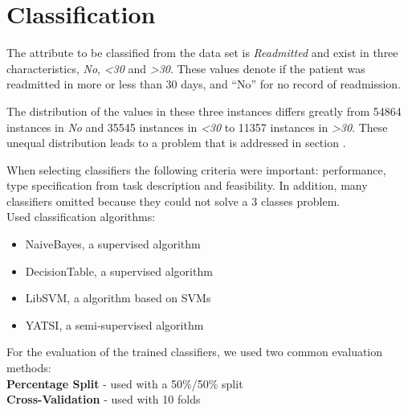 \section{Classification}
\label{classification}

The attribute to be classified from the data set is \textit{Readmitted} and exist in three characteristics, \textit{No},\textit{ \textless 30} and \textit{ \textgreater 30}. These values denote if the patient was readmitted in more or less than 30 days, and “No” for no record of readmission. \cite{OlmoMedicos}

The distribution of the values in these three instances differs greatly from 54864 instances in \textit{No} and 35545 instances in \textit{ \textless 30} to 11357 instances in \textit{ \textgreater 30}. These unequal distribution leads to a problem that is addressed in section . 

When selecting classifiers the following criteria were important: performance, type specification from task description and feasibility.
In addition, many classifiers omitted because they could not solve a 3 classes problem.
\\

Used classification algorithms:
\begin{itemize}
	\item[\textbullet] NaiveBayes, a supervised algorithm 
	\item[\textbullet] DecisionTable, a supervised algorithm 
	\item[\textbullet] LibSVM, a algorithm based on SVMs
	\item[\textbullet] YATSI, a semi-supervised algorithm
\end{itemize}



For the evaluation of the trained classifiers, we used two common evaluation methods:\\
\textbf{Percentage Split} - used with a 50\%/50\% split\\
\textbf{Cross-Validation} - used with 10 folds\\



